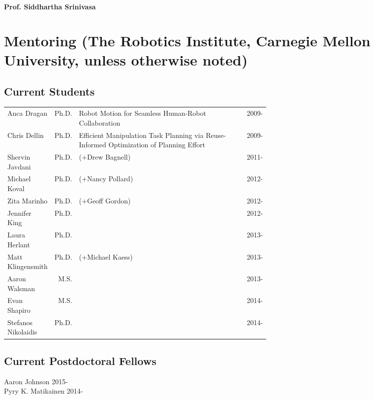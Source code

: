 \documentclass[10pt]{article}
\begin{document}
\pagestyle{empty} %

\par{\centering
		{\bf\LARGE Prof. Siddhartha Srinivasa
	}\bigskip\par}





\newpage

\section{Mentoring (The Robotics Institute, Carnegie Mellon University, unless otherwise noted)} 
\subsection{Current Students}
\vspace{-1em}
\begin{center}
\begin{tabular}{lrp{0.62\linewidth}ll}
Anca Dragan & Ph.D.  &Robot Motion for Seamless Human-Robot Collaboration & &2009-\\
Chris Dellin & Ph.D.  & Efficient Manipulation Task Planning via Reuse-Informed Optimization of Planning Effort  & &2009-\\
Shervin Javdani & Ph.D. &(+Drew Bagnell) & & 2011-\\
Michael Koval & Ph.D. &(+Nancy Pollard) & & 2012-\\ 
Zita Marinho & Ph.D. &(+Geoff Gordon) & & 2012-\\
Jennifer King & Ph.D. & & & 2012-\\ 
Laura Herlant & Ph.D. & & & 2013-\\
Matt Klingensmith & Ph.D. &(+Michael Kaess) & & 2013-\\
Aaron Walsman & M.S. & & & 2013-\\
Evan Shapiro & M.S. & & & 2014-\\
Stefanos Nikolaidis & Ph.D. & & & 2014-
\end{tabular}
\end{center}

\subsection{Current Postdoctoral Fellows}
\noindent
Aaron Johnson \hfill 2015-\\
Pyry K. Matikainen \hfill 2014-\\
\end{document}
